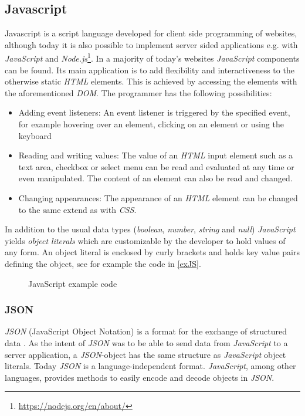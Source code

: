 \subsection{Javascript}
Javascript  \cite{Ackermann2015, mdn-web-dokumentation,wiki-js} is a script language developed for client side programming of websites, although today it is also possible to implement server sided applications e.g. with \textit{JavaScript} and \textit{Node.js}\footnote{\url{https://nodejs.org/en/about/}}. In a majority of today's websites \textit{JavaScript} components can be found. Its main application is to add flexibility and interactiveness to the otherwise static \textit{HTML} elements. This is achieved by accessing the elements with the aforementioned \textit{DOM}. The programmer has the following possibilities: 
\begin{itemize}
\item Adding event listeners: An event listener is triggered by the specified event, for example hovering over an element, clicking on an element or using the keyboard
\item Reading and writing values: The value of an \textit{HTML} input element such as a text area, checkbox or select menu can be read and evaluated at any time or even manipulated. The content of an element can also be read and changed.
\item Changing appearances: The appearance of an \textit{HTML} element can be changed to the same extend as with \textit{CSS}.
\end{itemize}
In addition to the usual data types (\textit{boolean}, \textit{number}, \textit{string} and \textit{null}) \textit{JavaScript} yields \textit{object literals} which are customizable by the developer to hold values of any form. An object literal is enclosed by curly brackets and holds key value pairs defining the object, see for example the code in \autoref{exJS}.

\begin{figure}[!h]

\caption{JavaScript example code}
\label{exJS}
\end{figure}

\subsubsection{JSON} 
\textit{JSON}  (JavaScript Object Notation) is a format for the exchange of structured data \cite{wiki:json}. As the intent of \textit{JSON} was to be able to send data from \textit{JavaScript} to a server application, a \textit{JSON}-object has the same structure as \textit{JavaScript} object literals. Today \textit{JSON} is a language-independent format. \textit{JavaScript}, among other languages, provides methods to easily encode and decode objects in \textit{JSON}.
